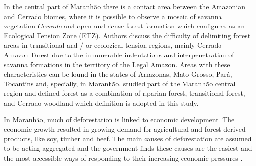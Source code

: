 In the central part of Maranhão there is a contact area between the Amazonian and Cerrado biomes, where it is possible to observe a mosaic of savanna vegetation \textit{Cerrado} and open and dense forest formation which configures as an Ecological Tension Zone (ETZ). Authors discuss the difficulty of delimiting forest areas in transitional and / or ecological tension regions, mainly Cerrado - Amazon Forest due to the innumerable indentations and interpenetration of savanna formations in the territory of the Legal Amazon. Areas with these characteristics can be found in the states of Amazonas, Mato Grosso, Pará, Tocantins and, specially, in Maranhão. \citet{GARCIA201716} studied part of the Maranhão central region and defined forest as a combination of riparian forest, transitional forest, and Cerrado woodland which definition is adopted in this study.

In Maranhão, much of deforestation is linked to economic development. The economic growth resulted in growing demand for agricultural and forest derived products, like soy, timber and beef. The main causes of deforestation are assumed to be acting aggregated and the government finds these causes are the easiest and the most accessible ways of responding to their increasing economic pressures \citep{GEIST,CULAS11,CELENTANO_2017}. 



